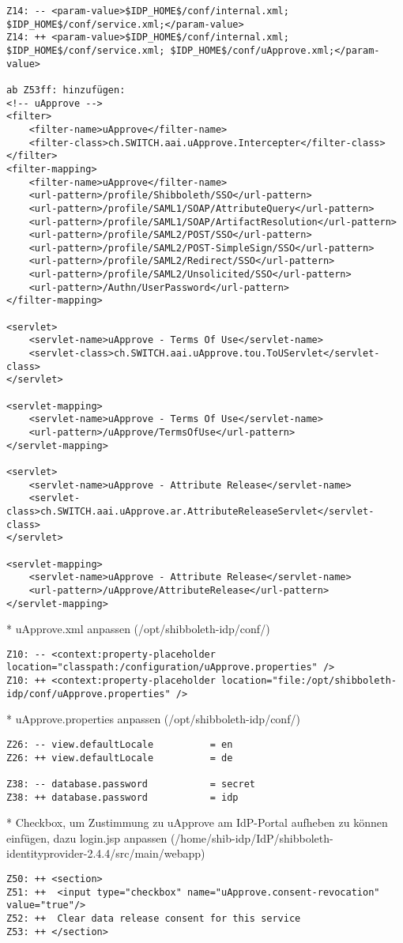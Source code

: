 \begin{lstlisting}
Z14: -- <param-value>$IDP_HOME$/conf/internal.xml; $IDP_HOME$/conf/service.xml;</param-value>
Z14: ++ <param-value>$IDP_HOME$/conf/internal.xml; $IDP_HOME$/conf/service.xml; $IDP_HOME$/conf/uApprove.xml;</param-value>

ab Z53ff: hinzufügen:
<!-- uApprove -->
<filter>
	<filter-name>uApprove</filter-name>
	<filter-class>ch.SWITCH.aai.uApprove.Intercepter</filter-class>
</filter>
<filter-mapping>
	<filter-name>uApprove</filter-name>
	<url-pattern>/profile/Shibboleth/SSO</url-pattern>
	<url-pattern>/profile/SAML1/SOAP/AttributeQuery</url-pattern>
	<url-pattern>/profile/SAML1/SOAP/ArtifactResolution</url-pattern>
	<url-pattern>/profile/SAML2/POST/SSO</url-pattern>
	<url-pattern>/profile/SAML2/POST-SimpleSign/SSO</url-pattern>
	<url-pattern>/profile/SAML2/Redirect/SSO</url-pattern>
	<url-pattern>/profile/SAML2/Unsolicited/SSO</url-pattern>
	<url-pattern>/Authn/UserPassword</url-pattern>
</filter-mapping>

<servlet>
	<servlet-name>uApprove - Terms Of Use</servlet-name>
	<servlet-class>ch.SWITCH.aai.uApprove.tou.ToUServlet</servlet-class>
</servlet>

<servlet-mapping>
	<servlet-name>uApprove - Terms Of Use</servlet-name>
	<url-pattern>/uApprove/TermsOfUse</url-pattern>
</servlet-mapping>

<servlet>
	<servlet-name>uApprove - Attribute Release</servlet-name>
	<servlet-class>ch.SWITCH.aai.uApprove.ar.AttributeReleaseServlet</servlet-class>
</servlet>

<servlet-mapping>
	<servlet-name>uApprove - Attribute Release</servlet-name>
	<url-pattern>/uApprove/AttributeRelease</url-pattern>
</servlet-mapping>
\end{lstlisting}
* uApprove.xml anpassen (/opt/shibboleth-idp/conf/)
\begin{lstlisting}
Z10: -- <context:property-placeholder location="classpath:/configuration/uApprove.properties" />
Z10: ++ <context:property-placeholder location="file:/opt/shibboleth-idp/conf/uApprove.properties" />
\end{lstlisting}
* uApprove.properties anpassen (/opt/shibboleth-idp/conf/)
\begin{lstlisting}
Z26: -- view.defaultLocale          = en
Z26: ++ view.defaultLocale          = de

Z38: -- database.password           = secret
Z38: ++ database.password           = idp
\end{lstlisting}
* Checkbox, um Zustimmung zu uApprove am IdP-Portal aufheben zu können
einfügen, dazu login.jsp anpassen (/home/shib-idp/IdP/shibboleth-identityprovider-2.4.4/src/main/webapp)
\begin{lstlisting}
Z50: ++ <section>
Z51: ++	 <input type="checkbox" name="uApprove.consent-revocation" value="true"/>
Z52: ++	 Clear data release consent for this service
Z53: ++	</section>
\end{lstlisting}
